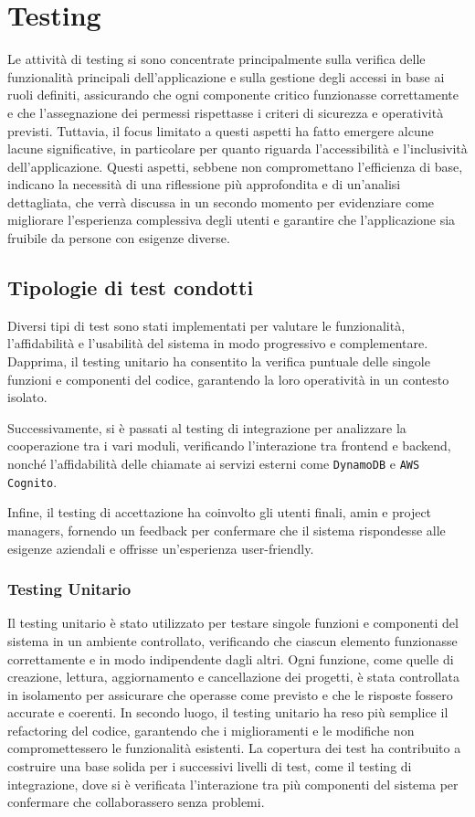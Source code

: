 \documentclass[target=bach,aauheader=,style=]{thud}
\begin{document}
\chapter{Testing}
Le attività di testing si sono concentrate principalmente sulla verifica delle funzionalità principali dell'applicazione e sulla gestione degli accessi in base ai ruoli definiti, assicurando che ogni componente critico funzionasse correttamente e che l'assegnazione dei permessi rispettasse i criteri di sicurezza e operatività previsti. Tuttavia, il focus limitato a questi aspetti ha fatto emergere alcune lacune significative, in particolare per quanto riguarda l'accessibilità e l'inclusività dell'applicazione. Questi aspetti, sebbene non compromettano l'efficienza di base, indicano la necessità di una riflessione più approfondita e di un'analisi dettagliata, che verrà discussa in un secondo momento per evidenziare come migliorare l'esperienza complessiva degli utenti e garantire che l'applicazione sia fruibile da persone con esigenze diverse.

\section{Tipologie di test condotti}
Diversi tipi di test sono stati implementati per valutare le funzionalità, l'affidabilità e l'usabilità del sistema in modo progressivo e complementare. Dapprima, il testing unitario ha consentito la verifica puntuale delle singole funzioni e componenti del codice, garantendo la loro operatività in un contesto isolato. 

\noindent Successivamente, si è passati al testing di integrazione per analizzare la cooperazione tra i vari moduli, verificando l'interazione tra frontend e backend, nonché l'affidabilità delle chiamate ai servizi esterni come \texttt{DynamoDB} e \texttt{AWS Cognito}. 

\noindent Infine, il testing di accettazione ha coinvolto gli utenti finali, amin e project managers, fornendo un feedback per confermare che il sistema rispondesse alle esigenze aziendali e offrisse un'esperienza user-friendly.

\subsection{Testing Unitario}
Il testing unitario è stato utilizzato per testare singole funzioni e componenti del sistema in un ambiente controllato, verificando che ciascun elemento funzionasse correttamente e in modo indipendente dagli altri. Ogni funzione, come quelle di creazione, lettura, aggiornamento e cancellazione dei progetti, è stata controllata in isolamento per assicurare che operasse come previsto e che le risposte fossero accurate e coerenti. In secondo luogo, il testing unitario ha reso più semplice il refactoring del codice, garantendo che i miglioramenti e le modifiche non compromettessero le funzionalità esistenti. La copertura dei test ha contribuito a costruire una base solida per i successivi livelli di test, come il testing di integrazione, dove si è verificata l'interazione tra più componenti del sistema per confermare che collaborassero senza problemi.
\end{document}
